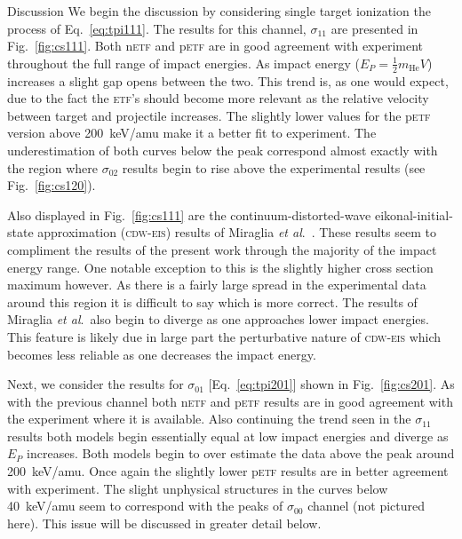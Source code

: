 \documentclass[aps, pra, reprint, groupedaddress, amsfonts,
               amsmath, amssymb, showpacs, nofootinbib]{revtex4-1}
\begin{document}
\begin{section}{Discussion \label{sec:disc}}
   We begin the discussion by considering single target ionization the process of Eq.~\eqref{eq:tpi111}.
   The results for this channel, $\sigma_{11}$ are presented in Fig.~\ref{fig:cs111}. Both n\textsc{etf}
   and p\textsc{etf} are in good agreement with experiment throughout the full range of impact energies.
   As impact energy ($E_P = \frac{1}{2} m_\textrm{He} V$) increases a slight gap opens between the two.
   This trend is, as one would expect, due to the fact the \textsc{etf}'s should become more relevant as
   the relative velocity between target and projectile increases. The slightly lower values for the
   p\textsc{etf} version above 200~keV/amu make it a better fit to experiment. The underestimation of
   both curves below the peak correspond almost exactly with the region where $\sigma_{02}$ results
   begin to rise above the experimental results (see Fig.~\ref{fig:cs120}).

   Also displayed in Fig.~\ref{fig:cs111} are the continuum-distorted-wave eikonal-initial-state
   approximation (\textsc{cdw-eis}) results of Miraglia \textit{et al}.~\cite{MG-10}. These results seem
   to compliment the results of the present work through the majority of the impact energy range. One
   notable exception to this is the slightly higher cross section maximum however. As there is a fairly
   large spread in the experimental data around this region it is difficult to say which is more
   correct. The results of Miraglia \textit{et al}.\ also begin to diverge as one approaches lower
   impact energies. This feature is likely due in large part the perturbative nature of \textsc{cdw-eis}
   which becomes less reliable as one decreases the impact energy.

   Next, we consider the results for $\sigma_{01}$ [Eq.~\eqref{eq:tpi201}] shown in Fig.~\ref{fig:cs201}.
   As with the previous channel both n\textsc{etf} and p\textsc{etf} results are in good agreement with
   the experiment where it is available. Also continuing the trend seen in the $\sigma_{11}$ results
   both models begin essentially equal at low impact energies and diverge as $E_P$ increases. Both
   models begin to over estimate the data above the peak around 200~keV/amu. Once again the slightly
   lower p\textsc{etf} results are in better agreement with experiment. The slight unphysical structures
   in the curves below 40~keV/amu seem to correspond with the peaks of $\sigma_{00}$ channel (not
   pictured here). This issue will be discussed in greater detail below.


\end{section}
\end{document}
